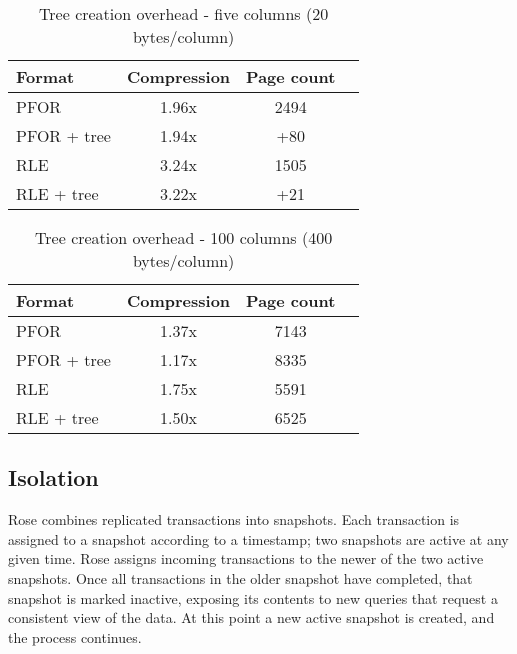 \documentclass{vldb}
\newcommand{\rows}{Rose\xspace}
\begin{document}
\begin{table}
\caption{Tree creation overhead - five columns (20 bytes/column)}
\centering
\label{table:treeCreation}
\begin{tabular}{|l|c|c|c|} \hline
Format     & Compression & Page count \\ \hline %
PFOR        & 1.96x       & 2494       \\ \hline %
PFOR + tree & 1.94x       & +80        \\ \hline %
RLE        & 3.24x       & 1505 \\ \hline %
RLE + tree & 3.22x       & +21        \\  %
\hline\end{tabular}
\end{table}
\begin{table}
\caption{Tree creation overhead - 100 columns (400 bytes/column)}
\centering
\label{table:treeCreationTwo}
\begin{tabular}{|l|c|c|c|} \hline
Format     & Compression & Page count \\ \hline %
PFOR        & 1.37x       & 7143       \\ \hline %
PFOR + tree & 1.17x       & 8335        \\ \hline %
RLE        & 1.75x       & 5591 \\ \hline %
RLE + tree & 1.50x       & 6525        \\  %

\hline\end{tabular}
\end{table}


\subsection{Isolation}
\label{sec:isolation}
\rows combines replicated transactions into snapshots.  Each transaction
is assigned to a snapshot according to a timestamp; two snapshots are
active at any given time.  \rows assigns incoming transactions to the
newer of the two active snapshots.  Once all transactions in the older
snapshot have completed, that snapshot is marked inactive, exposing
its contents to new queries that request a consistent view of the
data.  At this point a new active snapshot is created, and the process
continues.
\end{document}
